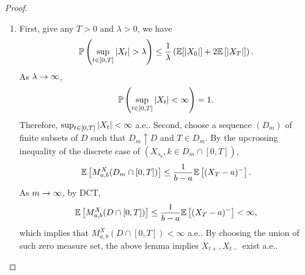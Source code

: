 \begin{proof}
    \begin{enumerate}[label=(\arabic{*})]
        \item First, give any $T>0$ and $\lambda > 0$, we have
        \begin{equation*}
            \mathbb{P}\left(\sup_{t \in [0,T]} \left\lvert X_t\right\lvert > \lambda\right) \leq \frac{1}{\lambda} \left(\mathbb{E}[\left\lvert X_0\right\lvert] + 2\mathbb{E}\left[\left\lvert X_T\right\lvert\right]\right).
        \end{equation*}
        As $\lambda \rightarrow \infty$,
        \begin{equation*}
            \mathbb{P}\left(\sup_{t \in [0,T]} \left\lvert X_t\right\lvert < \infty\right) = 1.
        \end{equation*}
        Therefore, $\sup_{t \in [0,T]} \left\lvert X_t\right\lvert < \infty$ a.e.. Second, choose a sequence $(D_m)$ of finite subsets of $D$ such that $D_m \uparrow D$ and $T \in D_m$. By the upcrossing inequality of the discrete case of $(X_{s_k}, k \in D_m \cap [0,T])$,
        \begin{equation*}
            \mathbb{E}\left[M^X_{a,b}(D_m \cap [0,T])\right] \leq \frac{1}{b-a}\mathbb{E}\left[(X_T - a)^-\right].
        \end{equation*}
        As $m \rightarrow \infty$, by DCT,
        \begin{equation*}
            \mathbb{E}\left[M^X_{a,b}(D \cap [0,T])\right] \leq \frac{1}{b-a}\mathbb{E}\left[(X_T - a)^-\right] < \infty,
        \end{equation*}
        which implies that $M^X_{a,b}(D \cap [0,T]) < \infty$ a.e.. By choosing the union of such zero measure set, the above lemma implies $X_{t+},X_{t-}$ exist a.e..


\end{enumerate}
\end{proof}
